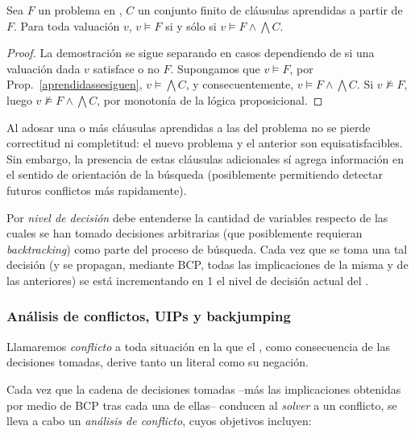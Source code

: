\begin{proposition}
Sea $F$ un problema en \cnf, $C$ un conjunto finito de cláusulas aprendidas a partir de $F$. Para toda valuación $v$, $v \models F$ si y sólo si $v \models F \land \bigwedge C$.
\end{proposition}
\begin{proof}
La demostración se sigue separando en casos dependiendo de si una valuación dada $v$ satisface o no $F$. Supongamos que $v \models F$, por Prop.~\ref{aprendidassesiguen}, $v \models \bigwedge C$, y consecuentemente, $v \models F \land \bigwedge C$. Si $v \not\models F$, luego $v \not\models F \land \bigwedge C$, por monotonía de la lógica proposicional.
\end{proof}

\begin{remark}
Al adosar una o más cláusulas aprendidas a las del problema no se pierde correctitud ni completitud: el nuevo problema y el anterior son equisatisfacibles. Sin embargo, la presencia de estas cláusulas adicionales sí agrega información en el sentido de orientación de la búsqueda (posiblemente permitiendo detectar futuros conflictos más rapidamente). 
\end{remark}

\begin{definition}
Por \emph{nivel de decisión} debe entenderse la cantidad de variables respecto de las cuales se han tomado decisiones arbitrarias (que posiblemente requieran \emph{backtracking}) como parte del proceso de búsqueda. Cada vez que se toma una tal decisión (y se propagan, mediante BCP, todas las implicaciones de la misma y de las anteriores) se está incrementando en 1 el nivel de decisión actual del \ssolver.
\end{definition}



\subsubsection{Análisis de conflictos, UIPs y backjumping}

\begin{definition}
Llamaremos \emph{conflicto} a toda situación en la que el \ssolver, como consecuencia de las decisiones tomadas, derive tanto un literal como su negación.
\end{definition}


Cada vez que la cadena de decisiones tomadas --más las implicaciones obtenidas por medio de BCP tras cada una de ellas-- conducen al \emph{solver} a un conflicto, se lleva a cabo un \emph{análisis de conflicto}, cuyos objetivos incluyen:

